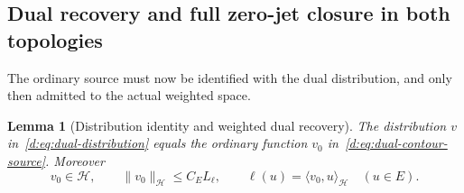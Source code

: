 \documentclass[11pt,a4paper]{article}
\numberwithin{equation}{section}
\newtheorem{lemma}[theorem]{Lemma}
\theoremstyle{definition}\newtheorem{definition}[theorem]{Definition}
\theoremstyle{remark}\newtheorem{remark}[theorem]{Remark}
\newcommand{\Hh}{\mathcal H}\newcommand{\Hw}{\mathcal H}
\newcommand{\ip}[2]{\langle#1,#2\rangle}\newcommand{\norm}[1]{\lVert#1\rVert}\newcommand{\abs}[1]{\lvert#1\rvert}
\begin{document}
\subsection{Dual recovery and full zero-jet closure in both topologies}\label{d:sec:Gamma-jet-core}

The ordinary source must now be identified with the dual distribution, and only then admitted to the actual weighted space.

\begin{lemma}[Distribution identity and weighted dual recovery]\label{d:lem:dual-recovery}
The distribution $v$ in~\eqref{d:eq:dual-distribution} equals the ordinary function $v_0$ in~\eqref{d:eq:dual-contour-source}. Moreover
\begin{equation}\label{d:eq:dual-H-recovery}
 v_0\in\Hh,\qquad \norm{v_0}_{\Hh}\le C_E L_\ell,\qquad
 \ell(u)=\ip{v_0}{u}_{\Hh}\quad(u\in E).
\end{equation}
\end{lemma}
\end{document}
